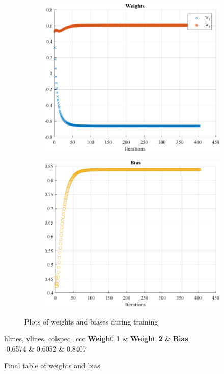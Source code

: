 \begin{figure}[htpb]
	\centering
	\begin{subfigure}[l]{0.47\textwidth}
		\centering
		\includegraphics[width=\textwidth]{../Problem 10/prob10_adaline_weights.pdf}
	\end{subfigure}
	\hspace{1mm}
	\begin{subfigure}[r]{0.47\textwidth}
		\centering
		\includegraphics[width=\textwidth]{../Problem 10/prob10_adaline_biases.pdf}
	\end{subfigure}
	\caption{Plots of weights and biases during training}
	\label{fig:prob10_plot_weights_biases}
\end{figure}

\begin{table}[H]
	\centering
	\begin{tblr}{hlines, vlines, colspec={ccc}}
		\textbf{Weight 1} & \textbf{Weight 2} & \textbf{Bias} \\
		-0.6574 & 0.6052 & 0.8407 \\
	\end{tblr}
	\caption{Final table of weights and bias}
	\label{table:prob10_final_weight_bias}
\end{table}